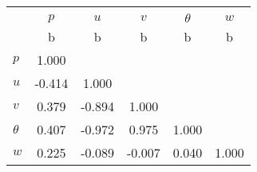 \begin{tabular}{l*{5}{c}}
\toprule
                &\multicolumn{5}{c}{}                             \\
                &    $ p $&    $ u $&    $ v $&$ \theta $&    $ w $\\
                &        b&        b&        b&        b&        b\\
\midrule
$ p $           &    1.000&         &         &         &         \\
$ u $           &   -0.414&    1.000&         &         &         \\
$ v $           &    0.379&   -0.894&    1.000&         &         \\
$ \theta $      &    0.407&   -0.972&    0.975&    1.000&         \\
$ w $           &    0.225&   -0.089&   -0.007&    0.040&    1.000\\
\bottomrule
\end{tabular}
